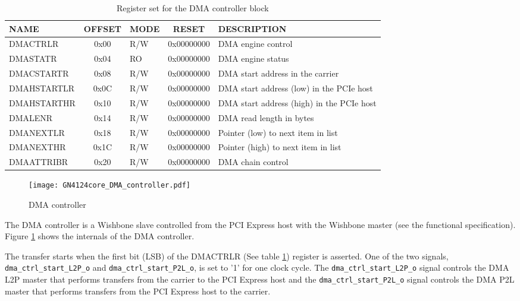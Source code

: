 \documentclass[10pt,a4paper]{cerndoc}
\begin{document}
\begin{table}[htbp]
  \centering
  \begin{tabularx}{\textwidth}{|l|c|l|c|X|}                                                   \hline
    \textbf{NAME}  & \textbf{OFFSET} & \textbf{MODE} & \textbf{RESET} & \textbf{DESCRIPTION}  \\ \hline \hline
    DMACTRLR       & 0x00 & R/W & 0x00000000 & DMA engine control                                       \\ \hline
    DMASTATR       & 0x04 & RO  & 0x00000000 & DMA engine status                                              \\ \hline
    DMACSTARTR     & 0x08 & R/W & 0x00000000 & DMA start address in the carrier                               \\ \hline
    DMAHSTARTLR    & 0x0C & R/W & 0x00000000 & DMA start address (low) in the PCIe host                       \\ \hline
    DMAHSTARTHR    & 0x10 & R/W & 0x00000000 & DMA start address (high) in the PCIe host                      \\ \hline
    DMALENR        & 0x14 & R/W & 0x00000000 & DMA read length in bytes                                       \\ \hline
    DMANEXTLR      & 0x18 & R/W & 0x00000000 & Pointer (low) to next item in list                             \\ \hline
    DMANEXTHR      & 0x1C & R/W & 0x00000000 & Pointer (high) to next item in list                            \\ \hline
    DMAATTRIBR     & 0x20 & R/W & 0x00000000 & DMA chain control                                              \\ \hline
  \end{tabularx}
  \caption{Register set for the DMA controller block}
  \label{tab:dma_control}
\end{table}

\begin{figure}[!ht]
  \centering
  \texttt{[image: GN4124core\_DMA\_controller.pdf]}
  \caption{DMA controller}
  \label{fig:GN4124core_dma_ctrl}
\end{figure}

The DMA controller is a Wishbone slave controlled from the PCI Express host with the Wishbone master (see the functional specification). Figure \ref{fig:GN4124core_dma_ctrl} shows the internals of the DMA controller.

The transfer starts when the first bit (LSB) of the DMACTRLR (See table  \ref{tab:dma_control}) register is asserted. One of the two signals, \verb+dma_ctrl_start_L2P_o+ and \verb+dma_ctrl_start_P2L_o+, is set to '1' for one clock cycle. The \verb+dma_ctrl_start_L2P_o+ signal controls the DMA L2P master that performs transfers from the carrier to the PCI Express host and the \verb+dma_ctrl_start_P2L_o+ signal controls the DMA P2L master that performs transfers from the PCI Express host to the carrier.
\end{document}
